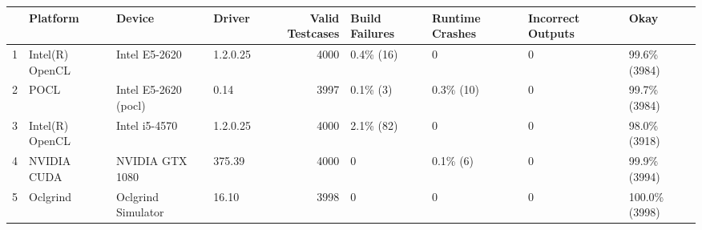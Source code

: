 \begin{tabular}{llllrllll}
\toprule
{} &         Platform &                Device &    Driver &  Valid Testcases & Build Failures & Runtime Crashes & Incorrect Outputs &           Okay \\
\midrule
1 &  Intel(R) OpenCL &         Intel E5-2620 &  1.2.0.25 &             4000 &      0.4\% (16) &               0 &                 0 &   99.6\% (3984) \\
2 &             POCL &  Intel E5-2620 (pocl) &      0.14 &             3997 &       0.1\% (3) &       0.3\% (10) &                 0 &   99.7\% (3984) \\
3 &  Intel(R) OpenCL &         Intel i5-4570 &  1.2.0.25 &             4000 &      2.1\% (82) &               0 &                 0 &   98.0\% (3918) \\
4 &      NVIDIA CUDA &       NVIDIA GTX 1080 &    375.39 &             4000 &              0 &        0.1\% (6) &                 0 &   99.9\% (3994) \\
5 &         Oclgrind &    Oclgrind Simulator &     16.10 &             3998 &              0 &               0 &                 0 &  100.0\% (3998) \\
\bottomrule
\end{tabular}
